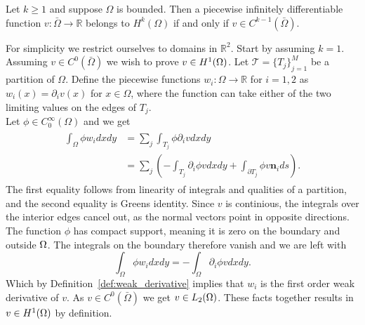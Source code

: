
\begin{thmx}{\quad\label{thm:h-and-c_connection}}
    Let $k\geq1$ and suppose $\Omega$ is bounded. Then a piecewise infinitely differentiable function $v:\bar{\Omega}\rightarrow \mathbb{R}$
    belongs to $H^k(\Omega)$ if and only if $v\in C^{k-1}(\bar{\Omega})$.
\end{thmx}

\begin{bev}
    For simplicity we restrict ourselves to domains in $\mathbb{R}^2$.
    Start by assuming $k=1$.
    Assuming $v\in C^0(\bar\Omega)$ we wish to prove $v\in H^1(\Omega)$. Let $\mathcal{T}={\{T_j\}}^M_{j=1}$ be a partition of $\Omega$.
    Define the piecewise functions $w_i:\Omega\rightarrow \mathbb{R}$ for $i=1,2$ as $w_i(x)=\partial_i v(x)$ for $x\in\Omega$,
     where the function can take either of the two limiting values on the edges of $T_j$. %
    \\
    Let $\phi\in C^{\infty}_0 (\Omega)$
   and we get
    \begin{align}
    \begin{split}
    \int_\Omega \phi w_i dxdy &= \sum_j\int_{T_j} \phi \partial_i v dx dy \\
        &= \sum_j \left( -\int_{T_j} \partial_i \phi v dxdy + \int_{\partial T_j} \phi v \mathbf{n}_i ds\right).
    \end{split}
    \end{align}
    The first equality follows from linearity of integrals and qualities of a partition, and the second equality is Greens identity.
    Since $v$ is continious, 
    the integrals over the interior edges cancel out,
    as the normal vectors point in opposite directions.
     The function $\phi$ has compact support, 
     meaning it is zero on the boundary and outside $\Omega$. 
     The integrals on the boundary therefore vanish and we are left with
    \begin{equation}
        \int_\Omega \phi w_i dxdy = -\int_\Omega \partial_i \phi v dxdy.
    \end{equation}
    Which by Definition~\ref{def:weak_derivative} implies that $w_i$ is the first order weak derivative of $v$.
    As $v\in C^0(\bar\Omega)$ we get $v \in L_2(\Omega)$. These facts together results in $v\in H^1(\Omega)$ by definition.


\end{bev}
